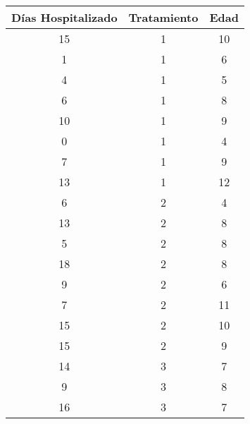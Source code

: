 \begin{enumerate}
\begin{center}

\begin{tabular}{|l|l|l|}
\hline
\multicolumn{1}{|c|}{Días Hospitalizado} & \multicolumn{1}{c|}{Tratamiento} & \multicolumn{1}{c|}{Edad} \\
\hline
\multicolumn{1}{|c|}{15} & \multicolumn{1}{c|}{1} & \multicolumn{1}{c|}{10} \\
\hline
\multicolumn{1}{|c|}{1} & \multicolumn{1}{c|}{1} & \multicolumn{1}{c|}{6} \\
\hline
\multicolumn{1}{|c|}{4} & \multicolumn{1}{c|}{1} & \multicolumn{1}{c|}{5} \\
\hline
\multicolumn{1}{|c|}{6} & \multicolumn{1}{c|}{1} & \multicolumn{1}{c|}{8} \\
\hline
\multicolumn{1}{|c|}{10} & \multicolumn{1}{c|}{1} & \multicolumn{1}{c|}{9} \\
\hline
\multicolumn{1}{|c|}{0} & \multicolumn{1}{c|}{1} & \multicolumn{1}{c|}{4} \\
\hline
\multicolumn{1}{|c|}{7} & \multicolumn{1}{c|}{1} & \multicolumn{1}{c|}{9} \\
\hline
\multicolumn{1}{|c|}{13} & \multicolumn{1}{c|}{1} & \multicolumn{1}{c|}{12} \\
\hline
\multicolumn{1}{|c|}{6} & \multicolumn{1}{c|}{2} & \multicolumn{1}{c|}{4} \\
\hline
\multicolumn{1}{|c|}{13} & \multicolumn{1}{c|}{2} & \multicolumn{1}{c|}{8} \\
\hline
\multicolumn{1}{|c|}{5} & \multicolumn{1}{c|}{2} & \multicolumn{1}{c|}{8} \\
\hline
\multicolumn{1}{|c|}{18} & \multicolumn{1}{c|}{2} & \multicolumn{1}{c|}{8} \\
\hline
\multicolumn{1}{|c|}{9} & \multicolumn{1}{c|}{2} & \multicolumn{1}{c|}{6} \\
\hline
\multicolumn{1}{|c|}{7} & \multicolumn{1}{c|}{2} & \multicolumn{1}{c|}{11} \\
\hline
\multicolumn{1}{|c|}{15} & \multicolumn{1}{c|}{2} & \multicolumn{1}{c|}{10} \\
\hline
\multicolumn{1}{|c|}{15} & \multicolumn{1}{c|}{2} & \multicolumn{1}{c|}{9} \\
\hline
\multicolumn{1}{|c|}{14} & \multicolumn{1}{c|}{3} & \multicolumn{1}{c|}{7} \\
\hline
\multicolumn{1}{|c|}{9} & \multicolumn{1}{c|}{3} & \multicolumn{1}{c|}{8} \\
\hline
\multicolumn{1}{|c|}{16} & \multicolumn{1}{c|}{3} & \multicolumn{1}{c|}{7} \\

\end{tabular}
\end{center}
\end{enumerate}
